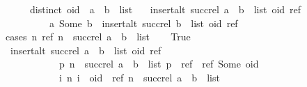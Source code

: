 \begin{isabellebody}
\ \ \ \ \ {\isachardoublequoteopen}distinct\ {\isacharparenleft}oid\ {\isacharhash}\ a\ {\isacharhash}\ b\ {\isacharhash}\ list{\isacharparenright}{\isachardoublequoteclose}\isanewline
\ \ \ {\isachardoublequoteopen}insert{\isacharunderscore}alt\ {\isacharparenleft}succ{\isacharunderscore}rel\ {\isacharparenleft}a\ {\isacharhash}\ b\ {\isacharhash}\ list{\isacharparenright}{\isacharparenright}\ {\isacharparenleft}oid{\isacharcomma}\ ref{\isacharparenright}\ {\isacharequal}\isanewline
\ \ \ \ \ \ \ \ \ {\isacharbraceleft}{\isacharparenleft}a{\isacharcomma}\ Some\ b{\isacharparenright}{\isacharbraceright}\ {\isasymunion}\ insert{\isacharunderscore}alt\ {\isacharparenleft}succ{\isacharunderscore}rel\ {\isacharparenleft}b\ {\isacharhash}\ list{\isacharparenright}{\isacharparenright}\ {\isacharparenleft}oid{\isacharcomma}\ ref{\isacharparenright}{\isachardoublequoteclose}\isanewline
%
\isadelimproof
%
\endisadelimproof
%
\isatagproof
{}\isamarkupfalse%
{\isacharparenleft}cases\ {\isachardoublequoteopen}{\isasymexists}n{\isachardot}\ {\isacharparenleft}ref{\isacharcomma}\ n{\isacharparenright}\ {\isasymin}\ succ{\isacharunderscore}rel\ {\isacharparenleft}a\ {\isacharhash}\ b\ {\isacharhash}\ list{\isacharparenright}{\isachardoublequoteclose}{\isacharparenright}\isanewline
\ \ \isamarkupfalse%
\ True\isanewline
\ \ \isamarkupfalse%
\ {\isachardoublequoteopen}insert{\isacharunderscore}alt\ {\isacharparenleft}succ{\isacharunderscore}rel\ {\isacharparenleft}a\ {\isacharhash}\ b\ {\isacharhash}\ list{\isacharparenright}{\isacharparenright}\ {\isacharparenleft}oid{\isacharcomma}\ ref{\isacharparenright}\ {\isacharequal}\isanewline
\ \ \ \ \ \ \ \ \ \ \ {\isacharbraceleft}{\isacharparenleft}p{\isacharcomma}\ n{\isacharparenright}\ {\isasymin}\ succ{\isacharunderscore}rel\ {\isacharparenleft}a\ {\isacharhash}\ b\ {\isacharhash}\ list{\isacharparenright}{\isachardot}\ p\ {\isasymnoteq}\ ref{\isacharbraceright}\ {\isasymunion}\ {\isacharbraceleft}{\isacharparenleft}ref{\isacharcomma}\ Some\ oid{\isacharparenright}{\isacharbraceright}\ {\isasymunion}\isanewline
\ \ \ \ \ \ \ \ \ \ \ {\isacharbraceleft}{\isacharparenleft}i{\isacharcomma}\ n{\isacharparenright}{\isachardot}\ i\ {\isacharequal}\ oid\ {\isasymand}\ {\isacharparenleft}ref{\isacharcomma}\ n{\isacharparenright}\ {\isasymin}\ succ{\isacharunderscore}rel\ {\isacharparenleft}a\ {\isacharhash}\ b\ {\isacharhash}\ list{\isacharparenright}{\isacharbraceright}{\isachardoublequoteclose}\isanewline
\ \ \ \ \isamarkupfalse%

\end{isabellebody}
